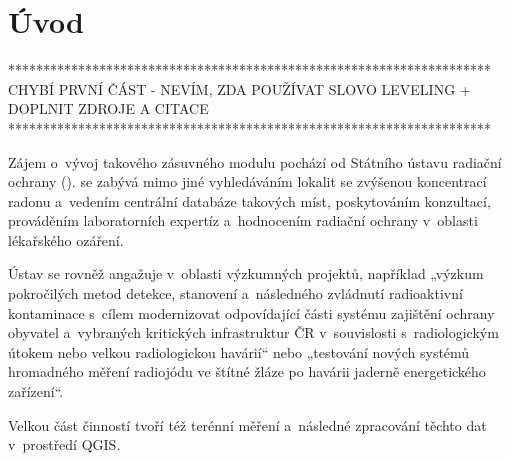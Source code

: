 \chapter{Úvod}
\label{1-uvod}

*********************************************************************
CHYBÍ PRVNÍ ČÁST - NEVÍM, ZDA POUŽÍVAT SLOVO LEVELING + DOPLNIT ZDROJE A CITACE
*********************************************************************

Zájem o~vývoj takového zásuvného modulu pochází od Státního ústavu radiační ochrany ().
 se zabývá mimo jiné vyhledáváním lokalit se zvýšenou koncentrací radonu a~vedením centrální
databáze takových míst, poskytováním konzultací, prováděním laboratorních expertíz a~hodnocením
radiační ochrany v~oblasti lékařského ozáření. 

Ústav se rovněž angažuje v~oblasti výzkumných projektů, například „výzkum pokročilých metod detekce,
stanovení a~následného zvládnutí radioaktivní kontaminace s~cílem modernizovat odpovídající části
systému zajištění ochrany obyvatel a~vybraných kritických infrastruktur ČR v~souvislosti
s~radiologickým útokem nebo velkou radiologickou havárií“ nebo „testování nových systémů
hromadného měření radiojódu ve štítné žláze po havárii jaderně energetického zařízení“. 

Velkou část činností  tvoří též terénní měření a~následné zpracování
těchto dat v~prostředí QGIS. 



